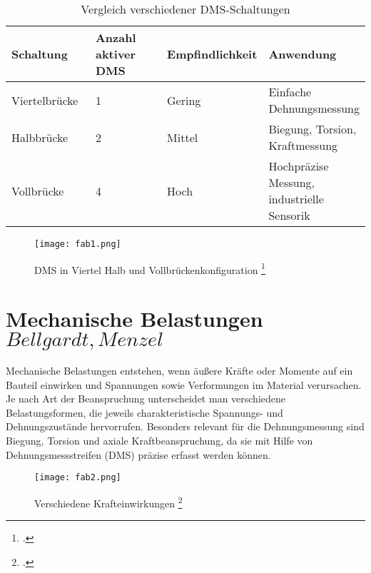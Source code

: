 \bgroup
\def\arraystretch{2}
\begin{table}[h]
\centering
\begin{tabular}{|p{0.25\linewidth}|p{0.25\linewidth}|p{0.25\linewidth}|p{0.25\linewidth}|}
\hline
Schaltung & Anzahl aktiver DMS & Empfindlichkeit & Anwendung \\ \hline
Viertelbrücke & 1 & Gering & Einfache Dehnungsmessung \\ \hline
Halbbrücke & 2 & Mittel & Biegung, Torsion, Kraftmessung \\ \hline
Vollbrücke & 4 & Hoch & Hochpräzise Messung, industrielle Sensorik \\ \hline
\end{tabular}
\caption{Vergleich verschiedener DMS-Schaltungen}
\label{tbl:dms_schaltungen}
\end{table}
\egroup


\begin{figure}[h]
    \begin{center}
        \texttt{[image: fab1.png]}
        \caption[DMS in Viertel\- Halb\- und Vollbr\"uckenkonfiguration (Abbildungsverzeichnis)]{DMS in Viertel\- Halb\- und Vollbr\"uckenkonfiguration
        \footcite{https://learnchannel-tv.com/wp-content/uploads/2020/12/Wheatstone-DMS-Messbrucke-Viertel-Halb-Vollbrucke-1024x423.png}
        }
        \label{fig:fab1}
    \end{center}
\end{figure}






\section{Mechanische Belastungen \(Bellgardt, Menzel\)}
Mechanische Belastungen entstehen, wenn äußere Kräfte oder Momente auf ein Bauteil einwirken und Spannungen sowie Verformungen im Material verursachen. Je nach Art der Beanspruchung unterscheidet man verschiedene Belastungsformen, die jeweils charakteristische Spannungs- und Dehnungszustände hervorrufen. Besonders relevant für die Dehnungsmessung sind Biegung, Torsion und axiale Kraftbeanspruchung, da sie mit Hilfe von Dehnungsmessstreifen (DMS) präzise erfasst werden können.

\begin{figure}[h]
    \begin{center}
        \texttt{[image: fab2.png]}
        \caption[Verschiedene Krafteinwirkungen (Abbildungsverzeichnis)]{Verschiedene Krafteinwirkungen
        \footcite{https://www.maschinenbau-wissen.de/bilder/skripte/mechanik/belastungsarten-03.PNG}
        }
        \label{fig:fab2}
    \end{center}
\end{figure}
